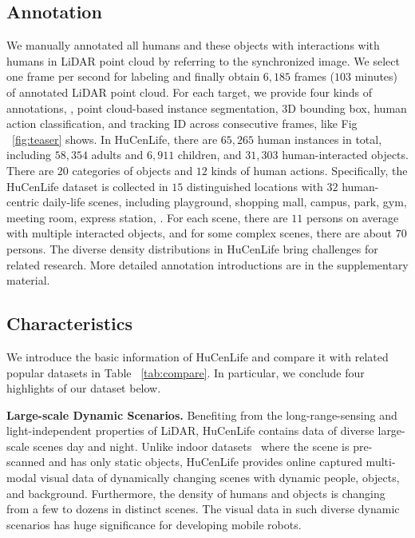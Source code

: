 \subsection{Annotation}
\label{subsec:Statistics}

We manually annotated all humans and these objects with interactions with humans in LiDAR point cloud by referring to the synchronized image. We select one frame per second for labeling and finally obtain $6,185$ frames ($103$ minutes) of annotated LiDAR point cloud. For each target, we provide four kinds of annotations, \ie, point cloud-based instance segmentation, 3D bounding box, human action classification, and tracking ID across consecutive frames, like Fig ~\ref{fig:teaser} shows. In HuCenLife, there are $65,265$ human instances in total, including $58,354$ adults and $6,911$ children, and $31,303$ human-interacted objects. There are $20$ categories of objects and $12$ kinds of human actions. Specifically, the HuCenLife dataset is collected in $15$ distinguished locations with $32$ human-centric daily-life scenes, including playground, shopping mall, campus, park, gym, meeting room, express station, \etc. For each scene, there are $11$ persons on average with multiple interacted objects, and for some complex scenes, there are about $70$ persons. The diverse density distributions in HuCenLife bring challenges for related research.
More detailed annotation introductions are in the supplementary material.


\subsection{Characteristics}
\label{subsec:Characteristic}
We introduce the basic information of HuCenLife and compare it with related popular datasets in Table ~\ref{tab:compare}. In particular, we conclude four highlights of our dataset below.

\textbf{Large-scale Dynamic Scenarios.} 
Benefiting from the long-range-sensing and light-independent properties of LiDAR, HuCenLife contains data of diverse large-scale scenes day and night. Unlike indoor datasets~\cite{dai2017scannet} where the scene is pre-scanned and has only static objects, HuCenLife provides online captured multi-modal visual data of dynamically changing scenes with dynamic people, objects, and background. Furthermore, the density of humans and objects is changing from a few to dozens in distinct scenes. The visual data in such diverse dynamic scenarios has huge significance for developing mobile robots.  

